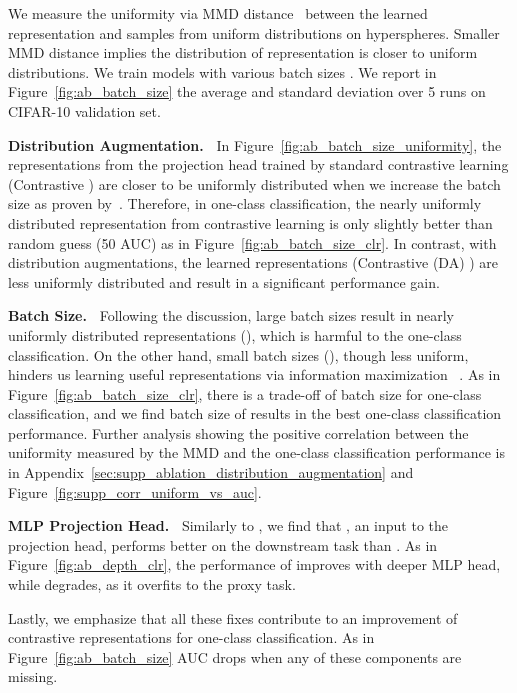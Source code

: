 \documentclass{article} \usepackage{iclr2021_conference,times}
\begin{document}
We measure the uniformity via MMD distance~\citep{gretton2012kernel} between the learned representation and samples from uniform distributions on hyperspheres. Smaller MMD distance implies the distribution of representation is closer to uniform distributions.
We train models with various batch sizes .
We report in Figure~\ref{fig:ab_batch_size} the average and standard deviation over 5 runs on CIFAR-10 validation set.

\textbf{Distribution Augmentation.~} In Figure~\ref{fig:ab_batch_size_uniformity}, the representations from the projection head  trained by standard contrastive learning (Contrastive ) are closer to be uniformly distributed when we increase the batch size as proven by~\cite{wang2020understanding}. Therefore, in one-class classification, the nearly uniformly distributed representation from contrastive learning is only slightly better than random guess (50 AUC) as in Figure~\ref{fig:ab_batch_size_clr}. In contrast, with distribution augmentations, the learned representations (Contrastive (DA) ) are less uniformly distributed and result in a significant performance gain. 

\textbf{Batch Size.~} 
Following the discussion, large batch sizes result in nearly uniformly distributed representations (), which is harmful to the one-class classification. On the other hand, small batch sizes (), though less uniform, hinders us learning useful representations via information maximization ~\citep{poole2019variational}. 
As in Figure~\ref{fig:ab_batch_size_clr}, there is a trade-off of batch size for one-class classification, and we find batch size of  results in the best one-class classification performance.
Further analysis showing the positive correlation between the uniformity measured by the MMD and the one-class classification performance is in Appendix~\ref{sec:supp_ablation_distribution_augmentation} and Figure~\ref{fig:supp_corr_uniform_vs_auc}.

\textbf{MLP Projection Head.~}
Similarly to \cite{chen2020simple}, we find that , an input to the projection head, performs better on the downstream task than . As in Figure~\ref{fig:ab_depth_clr}, the performance of  improves with deeper MLP head, while  degrades, as it overfits to the proxy task.


Lastly, we emphasize that all these fixes contribute to an improvement of contrastive representations for one-class classification. As in Figure~\ref{fig:ab_batch_size} AUC drops when any of these components are missing.
\end{document}
